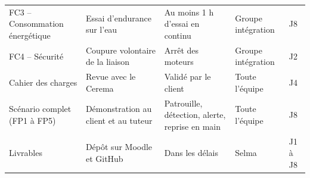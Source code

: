 \begin{table}[H]
\begin{tabularx}{\textwidth}{@{}>{\raggedright\arraybackslash}p{3.2cm}Lp{3.2cm}p{2.2cm}p{0.9cm}@{}}
FC3 -- Consommation énergétique & Essai d'endurance sur l'eau & Au moins 1 h d'essai en continu & Groupe intégration & J8 \\
FC4 -- Sécurité & Coupure volontaire de la liaison & Arrêt des moteurs & Groupe intégration & J2 \\
\midrule
Cahier des charges & Revue avec le Cerema & Validé par le client & Toute l'équipe & J4 \\
Scénario complet (FP1 à FP5) & Démonstration au client et au tuteur & Patrouille, détection, alerte, reprise en main & Toute l'équipe & J8 \\
Livrables & Dépôt sur Moodle et GitHub & Dans les délais & Selma & J1 à J8 \\
\bottomrule
\end{tabularx}
\end{table}
